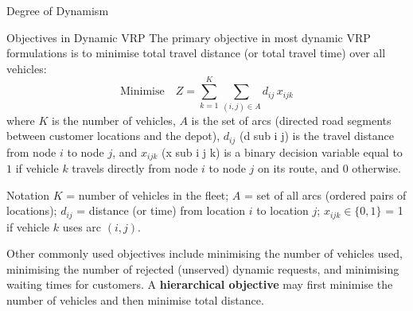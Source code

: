 \documentclass[aspectratio=169,10pt]{beamer}
\begin{document}
\begin{frame}[allowframebreaks]{Degree of Dynamism}
  \begin{block}{Objectives in Dynamic VRP}
    The primary objective in most dynamic VRP formulations is to minimise
    total travel distance (or total travel time) over all vehicles:
    \[
      \text{Minimise} \quad Z = \sum_{k=1}^{K} \sum_{(i,j) \in A} d_{ij} \, x_{ijk}
    \]
    where $K$ is the number of vehicles, $A$ is the set of arcs (directed road
    segments between customer locations and the depot), $d_{ij}$ (d sub i j) is
    the travel distance from node $i$ to node $j$, and $x_{ijk}$ (x sub i j k)
    is a binary decision variable equal to $1$ if vehicle $k$ travels directly
    from node $i$ to node $j$ on its route, and $0$ otherwise.
  \end{block}

  \begin{block}{Notation}
    $K$ = number of vehicles in the fleet; $A$ = set of all arcs (ordered
    pairs of locations); $d_{ij}$ = distance (or time) from location $i$ to
    location $j$; $x_{ijk} \in \{0, 1\}$ = 1 if vehicle $k$ uses arc $(i,j)$.
  \end{block}

  Other commonly used objectives include minimising the number of vehicles
  used, minimising the number of rejected (unserved) dynamic requests, and
  minimising waiting times for customers.  A \textbf{hierarchical objective}
  may first minimise the number of vehicles and then minimise total distance.

\end{frame}
\end{document}
